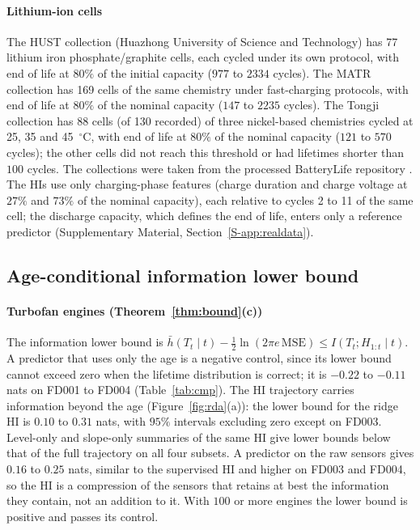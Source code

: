 \documentclass[preprint,12pt]{elsarticle}
\theoremstyle{definition}
\begin{document}
\paragraph{Lithium-ion cells} The HUST collection (Huazhong University of Science and Technology) \cite{ma2022} has 77 lithium iron phosphate/graphite cells, each cycled under its own protocol, with end of life at $80\%$ of the initial capacity ($977$ to $2334$ cycles). The MATR collection \cite{severson2019,attia2020} has 169 cells of the same chemistry under fast-charging protocols, with end of life at $80\%$ of the nominal capacity ($147$ to $2235$ cycles). The Tongji collection \cite{zhu2022} has 88 cells (of 130 recorded) of three nickel-based chemistries cycled at 25, 35 and 45~$^\circ$C, with end of life at $80\%$ of the nominal capacity ($121$ to $570$ cycles); the other cells did not reach this threshold or had lifetimes shorter than $100$ cycles. The collections were taken from the processed BatteryLife repository \cite{tan2025}. The HIs use only charging-phase features (charge duration and charge voltage at $27\%$ and $73\%$ of the nominal capacity), each relative to cycles 2 to 11 of the same cell; the discharge capacity, which defines the end of life, enters only a reference predictor (Supplementary Material, Section~\ref{S-app:realdata}).

\subsection{Age-conditional information lower bound}
\label{sec:cert}
\paragraph{Turbofan engines (Theorem~\ref{thm:bound}(c))} The information lower bound is $\bar h(T_t\mid t)-\tfrac12\ln(2\pi e\,\mathrm{MSE})\le I(T_t;H_{1:t}\mid t)$. A predictor that uses only the age is a negative control, since its lower bound cannot exceed zero when the lifetime distribution is correct; it is $-0.22$ to $-0.11$ nats on FD001 to FD004 (Table~\ref{tab:cmp}). The HI trajectory carries information beyond the age (Figure~\ref{fig:rda}(a)): the lower bound for the ridge HI is $0.10$ to $0.31$ nats, with $95\%$ intervals excluding zero except on FD003. Level-only and slope-only summaries of the same HI give lower bounds below that of the full trajectory on all four subsets. A predictor on the raw sensors gives $0.16$ to $0.25$ nats, similar to the supervised HI and higher on FD003 and FD004, so the HI is a compression of the sensors that retains at best the information they contain, not an addition to it. With $100$ or more engines the lower bound is positive and passes its control.
\end{document}

